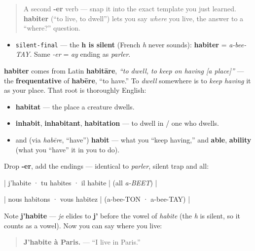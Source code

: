 \begin{quote}
A second \textbf{-er} verb — snap it into the exact template you just learned. \textbf{habiter} (\textquotedblleft{}to live, to dwell\textquotedblright{}) lets you say \emph{where} you live, the answer to a \textquotedblleft{}where?\textquotedblright{} question.
\end{quote}

\begin{sounds}
\begin{itemize}
\raggedright
  \item \texttt{silent-final} — the \textbf{h is silent} (French \emph{h} never sounds): \textbf{habiter} = \emph{a-bee-TAY}. Same \emph{-er} = \emph{ay} ending as \emph{parler}.
\end{itemize}
\end{sounds}

\begin{cousinweb}
\textbf{habiter} comes from Latin \textbf{habitāre}, \emph{\textquotedblleft{}to dwell, to keep on having {[}a place{]}\textquotedblright{}} — the \textbf{frequentative} of \textbf{habēre}, \textquotedblleft{}to have.\textquotedblright{} To \emph{dwell} somewhere is to \emph{keep having} it as your place. That root is thoroughly English:

\begin{itemize}
\raggedright
  \item \textbf{habitat} — the place a creature dwells.
  \item \textbf{inhabit}, \textbf{inhabitant}, \textbf{habitation} — to dwell in / one who dwells.
  \item and (via \emph{habēre}, \textquotedblleft{}have\textquotedblright{}) \textbf{habit} — what you \textquotedblleft{}keep having,\textquotedblright{} and \textbf{able}, \textbf{ability} (what you \textquotedblleft{}have\textquotedblright{} it in you to do).
\end{itemize}
\end{cousinweb}

\begin{grammarlens}[title={Grammar Lens: same -er template}]
Drop \textbf{-er}, add the endings — identical to \emph{parler}, silent trap and all:

| j'habite · tu habites · il habite | (all \emph{a-BEET}) |

| nous habitons · vous habitez | (a-bee-TON · a-bee-TAY) |

Note \textbf{j'habite} — \emph{je} elides to \textbf{j'} before the vowel of \emph{habite} (the \emph{h} is silent, so it counts as a vowel). Now you can say where you live:

\begin{quote}
\textbf{J'habite à Paris.} — \textquotedblleft{}I live in Paris.\textquotedblright{}
\end{quote}
\end{grammarlens}

